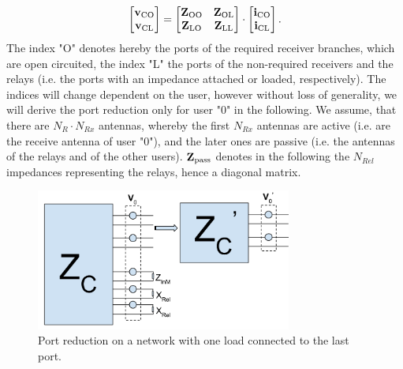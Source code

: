 \begin{align}
\label{eq:ocl_matrix}
\begin{bmatrix}
\mathbf{v}_\text{CO} \\
\mathbf{v}_\text{CL}
\end{bmatrix}
=
\begin{bmatrix}
\mathbf{Z}_\text{OO} & \mathbf{Z}_\text{OL}\\
\mathbf{Z}_\text{LO} & \mathbf{Z}_\text{LL}
\end{bmatrix}\cdot
\begin{bmatrix}
\mathbf{i}_\text{CO} \\
\mathbf{i}_\text{CL}
\end{bmatrix}.
\end{align}
The index "O" denotes hereby the ports of the required receiver branches, which are open circuited, the index "L" the ports of the non-required receivers and the relays (i.e. the ports with an impedance attached or loaded, respectively).
The indices will change dependent on the user, however without loss of generality, we will derive the port reduction only for user "0" in the following.
We assume, that there are $N_R \cdot N_{Rx}$ antennas, whereby the first $N_{Rx}$ antennas are active (i.e. are the receive antenna of user "0"), and the later ones are passive (i.e. the antennas of the relays and of the other users).
$\mathbf{Z}_{\text{pass}}$ denotes in the following the $N_{Rel}$ impedances representing the relays, hence a diagonal matrix.
\begin{figure}[h]
\begin{center}
\includegraphics[width=0.75\textwidth]{images/Port_reduction.png}
\caption{Port reduction on a network with one load connected to the last port.}
\label{fig:port_reduction}
\end{center}
\end{figure}

